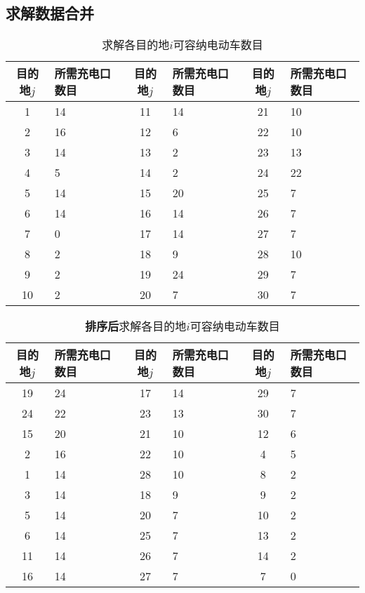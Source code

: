 \subsection{求解数据合并}
\begin{table}[H]
    \centering
	\caption{求解各目的地$i$可容纳电动车数目}
    \begin{tabular}{cp{3cm}<{\centering}||cp{3cm}<{\centering}||cp{3cm}<{\centering}}
        \toprule  %
        目的地$j$ & 所需充电口数目 &  目的地$j$&所需充电口数目 & 目的地$j$&所需充电口数目\\
        \midrule  %
        1 & 14  & 11 & 14 & 21 & 10 \\ 
        2 & 16  & 12 & 6  & 22 & 10 \\ 
        3 & 14  & 13 & 2  & 23 & 13 \\ 
        4 & 5  & 14 & 2  & 24 & 22 \\ 
        5 & 14  & 15 & 20  & 25 & 7 \\ 
        6 & 14  & 16 & 14  & 26 & 7 \\ 
        7 & 0  & 17 & 14  & 27 & 7 \\ 
        8 & 2  & 18 & 9  & 28 & 10 \\ 
        9 & 2  & 19 & 24  & 29 & 7 \\ 
        10 & 2  & 20 & 7  & 30 & 7 \\ 
        \bottomrule %
    \end{tabular}
\end{table}
\begin{table}[H]
    \centering
	\caption{\textbf{排序后}求解各目的地$i$可容纳电动车数目}
    \begin{tabular}{cp{3cm}<{\centering}||cp{3cm}<{\centering}||cp{3cm}<{\centering}}
        \toprule  %
        目的地$j$ & 所需充电口数目 &  目的地$j$&所需充电口数目 & 目的地$j$&所需充电口数目\\
        \midrule  %
        19 & 24 & 17 & 14  & 29 & 7 \\ 
        24 & 22  & 23 & 13  & 30 & 7 \\ 
        15 & 20  & 21 & 10  & 12 & 6 \\ 
        2 & 16  & 22 & 10  & 4 & 5 \\ 
        1 & 14  & 28 & 10  & 8 & 2 \\ 
        3 & 14  & 18 & 9  & 9 & 2 \\ 
        5 & 14  & 20 & 7  & 10 & 2 \\ 
        6 & 14  & 25 & 7 &  13 & 2 \\ 
        11 & 14  & 26 & 7 &  14 & 2 \\ 
        16 & 14  & 27 & 7 &  7 & 0 \\ 
        \bottomrule %
    \end{tabular}
\end{table}
